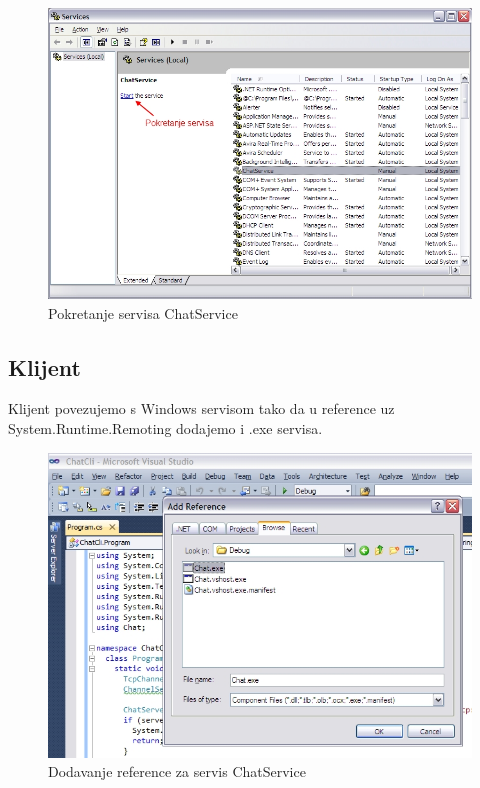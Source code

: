 \documentclass[10pt,a4paper,onecolumn,titlepage]{article}
\begin{document}
\begin{figure}[!ht]
\begin{minipage}{\textwidth}
\centering
\includegraphics[width=\textwidth]{images/start_service.jpg}
\caption{Pokretanje servisa ChatService}
\end{minipage}
\end{figure}

\subsection{Klijent}

Klijent povezujemo s Windows servisom tako da u reference uz System.Runtime.Remoting dodajemo i .exe servisa.

\newpage

\begin{figure}[!ht]
\begin{minipage}{\textwidth}
\centering
\includegraphics[width=\textwidth]{images/add_reference_service.jpg}
\caption{Dodavanje reference za servis ChatService}
\end{minipage}
\end{figure}
\end{document}
